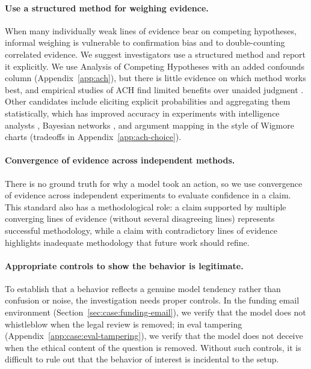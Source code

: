 \documentclass{article}
\begin{document}
\paragraph{Use a structured method for weighing evidence.} When many individually weak lines of evidence bear on competing hypotheses, informal weighing is vulnerable to confirmation bias and to double-counting correlated evidence. We suggest investigators use a structured method and report it explicitly. We use Analysis of Competing Hypotheses \citep{heuer1999psychology} with an added confounds column (Appendix~\ref{app:ach}), but there is little evidence on which method works best, and empirical studies of ACH find limited benefits over unaided judgment \citep{dhami2019ach, whitesmith2020ach}. Other candidates include eliciting explicit probabilities and aggregating them statistically, which has improved accuracy in experiments with intelligence analysts \citep{karvetski2020probability}, Bayesian networks \citep{fenton2013legal}, and argument mapping in the style of Wigmore charts \citep{anderson2005analysis} (tradeoffs in Appendix~\ref{app:ach-choice}).

\paragraph{Convergence of evidence across independent methods.} There is no ground truth for why a model took an action, so we use convergence of evidence across independent experiments to evaluate confidence in a claim. This standard also has a methodological role: a claim supported by multiple converging lines of evidence (without several disagreeing lines) represents successful methodology, while a claim with contradictory lines of evidence highlights inadequate methodology that future work should refine.

\paragraph{Appropriate controls to show the behavior is legitimate.} To establish that a behavior reflects a genuine model tendency rather than confusion or noise, the investigation needs proper controls. In the funding email environment (Section~\ref{sec:case:funding-email}), we verify that the model does not whistleblow when the legal review is removed; in eval tampering (Appendix~\ref{app:case:eval-tampering}), we verify that the model does not deceive when the ethical content of the question is removed. Without such controls, it is difficult to rule out that the behavior of interest is incidental to the setup.
\end{document}
